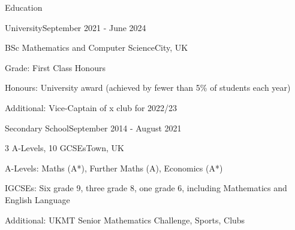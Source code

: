 \documentclass[10pt,a4paper]{CV}
\begin{document}

\begin{Section}{Education}
    \begin{Institution}{University}{September 2021 - June 2024}
        \begin{Position}{BSc Mathematics and Computer Science}{City, UK}
            \item Grade: First Class Honours
            \item Honours: University award (achieved by fewer than 5\% of students each year)
            \item Additional: Vice-Captain of x club for 2022/23
        \end{Position}
    \end{Institution}

    \begin{Institution}{Secondary School}{September 2014 - August 2021}
        \begin{Position}{3 A-Levels, 10 GCSEs}{Town, UK}
            \item A-Levels: Maths (A*), Further Maths (A), Economics (A*)
            \item IGCSEs: Six grade 9, three grade 8, one grade 6, including Mathematics and English Language
            \item Additional: UKMT Senior Mathematics Challenge, Sports, Clubs
        \end{Position}
    \end{Institution}
\end{Section}
\end{document}
